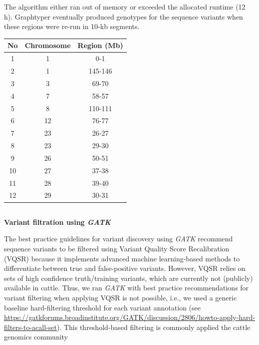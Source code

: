 \documentclass[../main.tex]{subfiles}
\begin{document}
\begin{flushleft}
The algorithm either ran out of memory or exceeded the allocated runtime (12 h). Graphtyper eventually produced genotypes for the sequence variants when these regions were re-run in 10-kb segments.

\bigskip
\bigskip
\bigskip

\begin{center}
    \begin{tabular}{|c|c|c|} 
        \hline
        No & Chromosome & Region (Mb)  \\ 
        \hline
        1  & 1          & 0-1          \\ 
        \hline
        2  & 1          & 145-146      \\ 
        \hline
        3  & 3          & 69-70        \\ 
        \hline
        4  & 7          & 58-57        \\ 
        \hline
        5  & 8          & 110-111      \\ 
        \hline
        6  & 12         & 76-77        \\ 
        \hline
        7  & 23         & 26-27        \\ 
        \hline
        8  & 23         & 29-30        \\ 
        \hline
        9  & 26         & 50-51        \\ 
        \hline
        10 & 27         & 37-38        \\ 
        \hline
        11 & 28         & 39-40        \\ 
        \hline
        12 & 29         & 30-31        \\
        \hline
        \end{tabular}
\end{center}

\newpage
\subsection{}
\label{supp_mat:26}
\textbf{\large{Variant filtration using \emph{GATK}}}
\bigskip

The best practice guidelines for variant discovery using \emph{GATK} recommend sequence
variants to be filtered using Variant Quality Score Recalibration (VQSR) because it
implements advanced machine learning-based methods to differentiate between true and
false-positive variants. However, VQSR relies on sets of high confidence truth/training
variants, which are currently not (publicly) available in cattle. Thus, we ran \emph{GATK} with best
practice recommendations for variant filtering when applying VQSR is not possible, i.e., we
used a generic baseline hard-filtering threshold for each variant annotation (see
\url{https://gatkforums.broadinstitute.org/GATK/discussion/2806/howto-apply-hard-filters-to-acall-set}). This threshold-based filtering is commonly applied the cattle genomics community
\citep{koufariotis2018sequencing,chen2018whole}
\bigskip




\end{flushleft}
\end{document}
